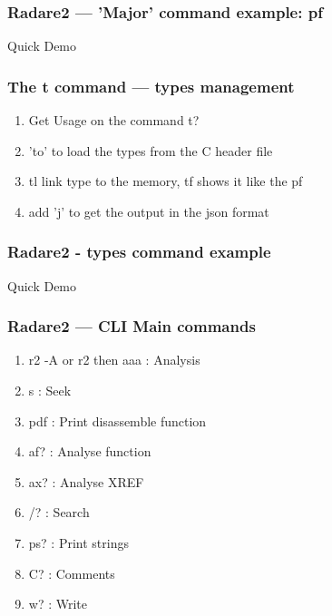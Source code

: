 \documentclass[10pt, compress]{beamer}
\begin{document}
\begin{frame}[fragile]
  \frametitle{Radare2 — 'Major' command example: pf}
  Quick Demo
\end{frame}

\begin{frame}[fragile]
  \frametitle{The t command — types management}
  \begin{enumerate}
  \item Get Usage on the command \alert{t?}
  \item 'to' to load the types from the C header file
  \item tl link type to the memory, tf shows it like the pf
  \item add 'j' to get the output in the json format
 \end{enumerate}
\end{frame}



\begin{frame}[fragile]
  \frametitle{Radare2 - types command example}
  Quick Demo
\end{frame}

\begin{frame}[fragile]
  \frametitle{Radare2 — CLI Main commands}
  \begin{enumerate}
   \item r2 -A or r2 then aaa : Analysis
   \item s : Seek
   \item pdf : Print disassemble function
   \item af? : Analyse function
   \item ax? : Analyse XREF
   \item /? : Search
   \item ps? : Print strings
   \item C? : Comments
   \item w? : Write
 \end{enumerate}
\end{frame}
\end{document}
